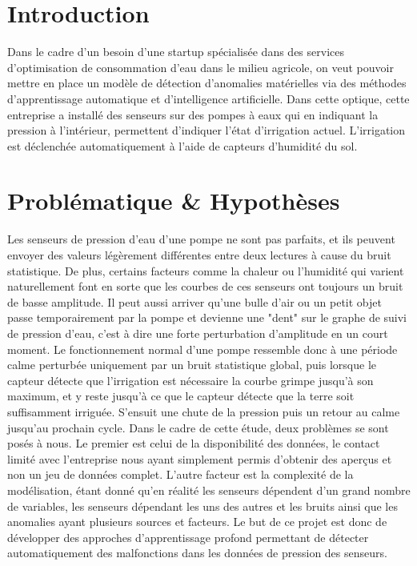 \documentclass[french]{article}
\theoremstyle{mytheoremstyle}
\theoremstyle{mytheoremstyle}
\theoremstyle{myproblemstyle}
\begin{document}
\begin{titlepage}
\begin{center}
            \vfill

        
          \end{center}
    \end{titlepage}

    \tableofcontents
    \clearpage
    

    \section{Introduction}
    Dans le cadre d'un besoin d'une startup spécialisée dans des services d'optimisation de consommation d'eau dans le milieu agricole, on veut pouvoir mettre en place un modèle de détection d'anomalies matérielles via des méthodes d'apprentissage automatique et d'intelligence artificielle. Dans cette optique, cette entreprise a installé des senseurs sur des pompes à eaux qui en indiquant la pression à l'intérieur, permettent d'indiquer l'état d'irrigation actuel. L'irrigation est déclenchée automatiquement à l'aide de capteurs d'humidité du sol.     
    \section{Problématique \& Hypothèses}
    Les senseurs de pression d'eau d'une pompe ne sont pas parfaits, et ils peuvent envoyer des valeurs légèrement différentes entre deux lectures à cause du bruit statistique. De plus, certains facteurs comme la chaleur ou l'humidité qui varient naturellement font en sorte que les courbes de ces senseurs ont toujours un bruit de basse amplitude. Il peut aussi arriver qu'une bulle d'air ou un petit objet passe temporairement par la pompe et devienne une "dent" sur le graphe de suivi de pression d'eau, c'est à dire une forte perturbation d'amplitude en un court moment.
    \newline
    \indent Le fonctionnement normal d'une pompe ressemble donc à une période calme perturbée uniquement par un bruit statistique global, puis lorsque le capteur détecte que l'irrigation est nécessaire la courbe grimpe jusqu'à son maximum, et y reste jusqu'à ce que le capteur détecte que la terre soit suffisamment irriguée. S'ensuit une chute de la pression puis un retour au calme jusqu'au prochain cycle.
    \newline
    \indent Dans le cadre de cette étude, deux problèmes se sont posés à nous. Le premier est celui de la disponibilité des données, le contact limité avec l'entreprise nous ayant simplement permis d'obtenir des aperçus et non un jeu de données complet. L'autre facteur est la complexité de la modélisation, étant donné qu'en réalité les senseurs dépendent d'un grand nombre de variables, les senseurs dépendant les uns des autres et les bruits ainsi que les anomalies ayant plusieurs sources et facteurs. 
    \newline
    \indent Le but de ce projet est donc de développer des approches d'apprentissage profond permettant de détecter automatiquement des malfonctions dans les données de pression des senseurs.
\end{document}
